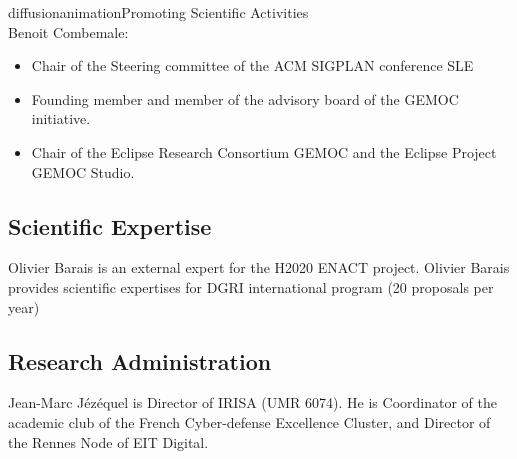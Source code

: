 \documentclass{ra2018}
\begin{document}
\begin{module}{diffusion}{animation}{Promoting Scientific Activities}
~\\
Benoit Combemale:
\begin{itemize}
	\item Chair of the Steering committee of the ACM SIGPLAN conference SLE
	\item Founding member and member of the advisory board of the GEMOC initiative. 
	\item Chair of the Eclipse Research Consortium GEMOC and the Eclipse Project GEMOC Studio. 
\end{itemize}






\subsection{Scientific Expertise}

Olivier Barais is an external expert for the H2020 ENACT project.  Olivier Barais provides scientific expertises for DGRI international program (20 proposals per year)


\subsection{Research Administration}
  
  Jean-Marc J\'ez\'equel is Director of IRISA (UMR 6074). He is 
  Coordinator of the academic club of the French Cyber-defense Excellence 
  Cluster, and Director of the Rennes Node of EIT Digital.
  
\end{module}
\end{document}
